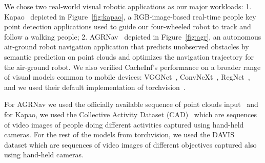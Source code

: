 
We chose two real-world visual robotic applications as our major workloads: 1. Kapao~\cite{kapao} depicted in Figure~\ref{fig:kapao}, a RGB-image-based real-time people key point detection applications used to guide our four-wheeled robot to track and follow a walking people;
2. AGRNav~\cite{agrnav} depicted in Figure~\ref{fig:agr}, an autonomous air-ground robot navigation application that predicts unobserved obstacles by semantic prediction on point clouds and optimizes the navigation trajectory for the air-ground robot.
We also verified CacheInf's performance on a broader range of visual models common to mobile devices: VGGNet~\cite{simonyan2015deep}, ConvNeXt~\cite{woo2023convnext}, RegNet~\cite{xu2022regnet}, and we used their default implementation of torchvision~\cite{noauthor_torchvision_nodate}. 

For AGRNav we used the officially available sequence of point clouds input~\cite{agrnav} and for Kapao, we used the Collective Activity Dataset (CAD)~\cite{Choi_VSWS_2009} which are sequences of video images of people doing different activities captured using hand-held cameras.
For the rest of the models from torchvision, we used the DAVIS~\cite{Perazzi2016} dataset which are sequences of video images of different objectives captured also using hand-held cameras.

